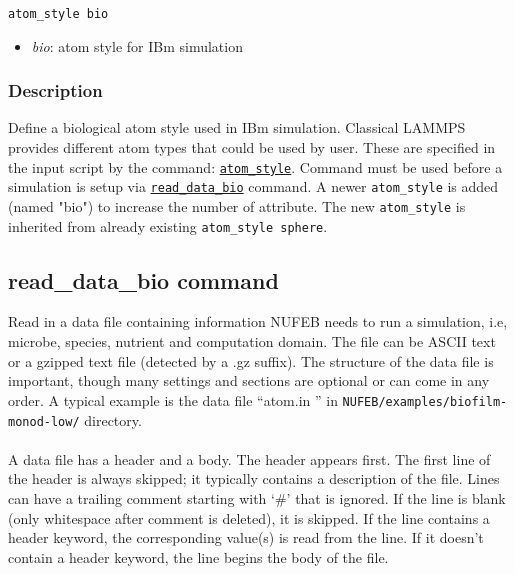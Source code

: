 \documentclass[11pt,a4paper,openright]{article}
\begin{document}
\begin{Verbatim}[frame=single]
   atom_style bio
\end{Verbatim}

\begin{itemize}
\item
	{\it bio}: atom style for IBm simulation
\end{itemize}

\subsubsection*{Description}

Define a biological atom style used in IBm simulation. Classical LAMMPS provides different atom types that could be used by user. These are specified in the input script by the command: \href{http://lammps.sandia.gov/doc/atom_style.html}{\tt atom\_style}. Command must be used before a simulation is setup via \hyperref[readdata]{\tt read\_data\_bio} command. A newer {\tt atom\_style} is added (named "bio") to increase the number of attribute. The new {\tt atom\_style} is inherited from already existing {\tt atom\_style sphere}. 

\newpage
\subsection{read\_data\_bio command}
\label{readdata}

Read in a data file containing information NUFEB needs to run a simulation, 
i.e, microbe, species, nutrient and computation domain. 
The file can be ASCII text or a gzipped text file (detected by a .gz suffix). 
The structure of the data file is important, 
though many settings and sections are optional or can come in any order.
A typical example is the data file ``atom.in ''
in {\tt NUFEB/examples/biofilm-monod-low/} directory.\\


\\

A data file has a header and a body. The header appears first. 
The first line of the header is always skipped; it typically contains a description of the file.
Lines can have a trailing comment starting with `\#' that is ignored. If the line is blank (only whitespace after comment is deleted), it is skipped. If the line contains a header keyword, the corresponding value(s) is read from the line. If it doesn't contain a header keyword, the line begins the body of the file.
\end{document}
